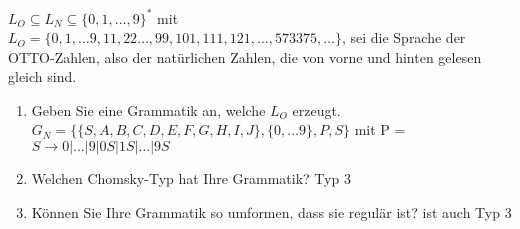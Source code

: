 \documentclass[12pt]{article}
\begin{document}
 $L_O \subseteq L_N \subseteq \{0,1,\ldots,9\}^*$ mit $L_O = \{0, 1, \ldots 9, 11, 22 \ldots , 99, 101, 111, 121, \ldots , 573375, \ldots \}$, sei die Sprache der OTTO-Zahlen, also der natürlichen Zahlen, die von vorne und hinten gelesen gleich sind. 
 \begin{enumerate} 
 \item Geben Sie eine Grammatik an, welche $L_O$ erzeugt.\\ 
 $G_N = \{\{S,A,B,C,D,E,F,G,H,I,J\},\{0,...9\},P,S\}$ mit P =\\
 $S \rightarrow 0|...|9|0S|1S|...|9S$\\
 \item Welchen Chomsky-Typ hat Ihre Grammatik? 
 Typ 3
 \item Können Sie Ihre Grammatik so umformen, dass sie regulär ist? 
 ist auch Typ 3
 \end{enumerate}  
  
  
 
\end{document}
